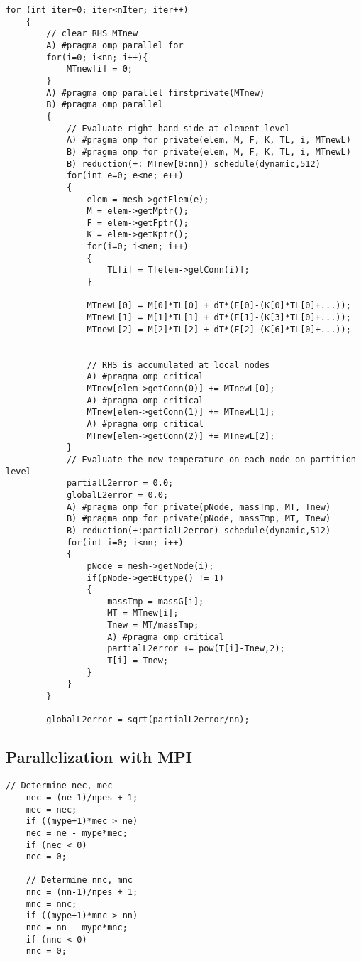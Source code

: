 \begin{lstlisting}[caption={\label{Code:OpenMP} Parallelization of two most time consuming loops with implementation A and B}]
	for (int iter=0; iter<nIter; iter++)
	{
		// clear RHS MTnew
		A) #pragma omp parallel for
		for(i=0; i<nn; i++){
			MTnew[i] = 0;
		}
		A) #pragma omp parallel firstprivate(MTnew)
		B) #pragma omp parallel
		{
			// Evaluate right hand side at element level
			A) #pragma omp for private(elem, M, F, K, TL, i, MTnewL)
			B) #pragma omp for private(elem, M, F, K, TL, i, MTnewL) 
			B) reduction(+: MTnew[0:nn]) schedule(dynamic,512)
			for(int e=0; e<ne; e++)
			{
				elem = mesh->getElem(e);
				M = elem->getMptr();
				F = elem->getFptr();
				K = elem->getKptr();
				for(i=0; i<nen; i++)
				{
					TL[i] = T[elem->getConn(i)];
				}
				
				MTnewL[0] = M[0]*TL[0] + dT*(F[0]-(K[0]*TL[0]+...));
				MTnewL[1] = M[1]*TL[1] + dT*(F[1]-(K[3]*TL[0]+...));
				MTnewL[2] = M[2]*TL[2] + dT*(F[2]-(K[6]*TL[0]+...));
				
				
				// RHS is accumulated at local nodes
				A) #pragma omp critical
				MTnew[elem->getConn(0)] += MTnewL[0];
				A) #pragma omp critical
				MTnew[elem->getConn(1)] += MTnewL[1];
				A) #pragma omp critical
				MTnew[elem->getConn(2)] += MTnewL[2];
			}
			// Evaluate the new temperature on each node on partition level
			partialL2error = 0.0;
			globalL2error = 0.0;
			A) #pragma omp for private(pNode, massTmp, MT, Tnew)
			B) #pragma omp for private(pNode, massTmp, MT, Tnew) 
			B) reduction(+:partialL2error) schedule(dynamic,512)
			for(int i=0; i<nn; i++)
			{
				pNode = mesh->getNode(i);
				if(pNode->getBCtype() != 1)
				{
					massTmp = massG[i];
					MT = MTnew[i];
					Tnew = MT/massTmp;
					A) #pragma omp critical
					partialL2error += pow(T[i]-Tnew,2);
					T[i] = Tnew;
				}
			}
		}
		
		globalL2error = sqrt(partialL2error/nn);
\end{lstlisting}

\subsection{Parallelization with MPI}

\begin{lstlisting}[caption={\label{Code:MPI1} Determination of number elements on current rank and number nodes in current}]
	// Determine nec, mec
	nec = (ne-1)/npes + 1;
	mec = nec;
	if ((mype+1)*mec > ne)
	nec = ne - mype*mec;
	if (nec < 0)
	nec = 0;
	
	// Determine nnc, mnc
	nnc = (nn-1)/npes + 1;
	mnc = nnc;
	if ((mype+1)*mnc > nn)
	nnc = nn - mype*mnc;
	if (nnc < 0)
	nnc = 0;
\end{lstlisting}

